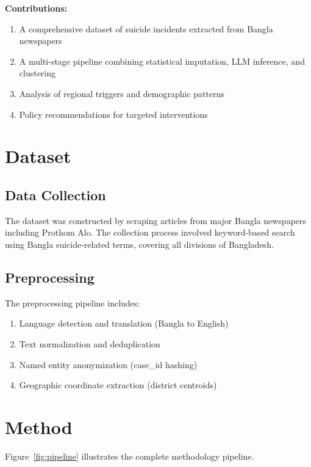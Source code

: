 \documentclass[conference]{IEEEtran}
\begin{document}
\textbf{Contributions:}
\begin{enumerate}
    \item A comprehensive dataset of suicide incidents extracted from Bangla newspapers
    \item A multi-stage pipeline combining statistical imputation, LLM inference, and clustering
    \item Analysis of regional triggers and demographic patterns
    \item Policy recommendations for targeted interventions
\end{enumerate}

\section{Dataset}

\subsection{Data Collection}
The dataset was constructed by scraping articles from major Bangla newspapers including Prothom Alo. The collection process involved keyword-based search using Bangla suicide-related terms, covering all divisions of Bangladesh.

\subsection{Preprocessing}
The preprocessing pipeline includes:
\begin{enumerate}
    \item Language detection and translation (Bangla to English)
    \item Text normalization and deduplication
    \item Named entity anonymization (case\_id hashing)
    \item Geographic coordinate extraction (district centroids)
\end{enumerate}

\section{Method}

Figure~\ref{fig:pipeline} illustrates the complete methodology pipeline.
\end{document}
